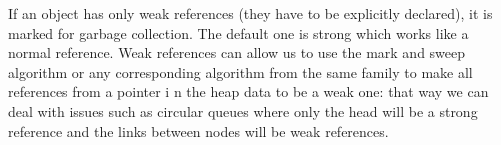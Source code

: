 \documentclass[12pt]{article}
\renewcommand{\_}{\kern-1.5pt\textunderscore\kern-1.5pt}
\begin{document}
If an object has only weak references (they have to be explicitly declared), it is marked for garbage collection. The default one is strong which works like a normal reference. Weak references can allow us to use the mark and sweep algorithm or any corresponding algorithm from the same family to make all references from a pointer i n the heap data to be a weak one: that way we can deal with issues such as circular queues where only the head will be a strong reference and the links between nodes will be weak references. \par


\vspace{\baselineskip}

\printbibliography
\end{document}
